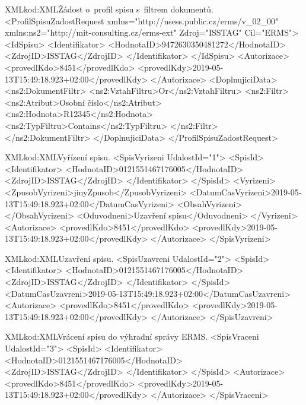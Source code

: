\documentclass[
  master,
  field=ainfp,
  biblatex,
  language=czech,
  glossaries,
  theorems=false,
  index
]{kidiplom}
\begin{document}
\begin{kicode}{XML}{kod:XML}{Žádost o~profil spisu s~filtrem dokumentů.}
<ProfilSpisuZadostRequest xmlns="http://nsess.public.cz/erms/v_02_00" 
    xmlns:ns2="http://mit-consulting.cz/erms-ext" Zdroj="ISSTAG" Cil="ERMS">
    <IdSpisu>
        <Identifikator>
            <HodnotaID>9472630350481272</HodnotaID>
            <ZdrojID>ISSTAG</ZdrojID>
        </Identifikator>
    </IdSpisu>
    <Autorizace>
        <provedlKdo>8451</provedlKdo>
        <provedlKdy>2019-05-13T15:49:18.923+02:00</provedlKdy>
    </Autorizace>
    <DoplnujiciData>
        <ns2:DokumentFiltr>
            <ns2:VztahFiltru>Or</ns2:VztahFiltru>
            <ns2:Filtr>
                <ns2:Atribut>Osobní číslo</ns2:Atribut>
                <ns2:Hodnota>R12345</ns2:Hodnota>
                <ns2:TypFiltru>Contains</ns2:TypFiltru>
            </ns2:Filtr>
        </ns2:DokumentFiltr>
    </DoplnujiciData>
</ProfilSpisuZadostRequest>
\end{kicode}

\begin{kicode}{XML}{kod:XML}{Vyřízení spisu.}
<SpisVyrizeni UdalostId="1">
    <SpisId>
        <Identifikator>
            <HodnotaID>0121551467176005</HodnotaID>
            <ZdrojID>ISSTAG</ZdrojID>
        </Identifikator>
    </SpisId>
    <Vyrizeni>
        <ZpusobVyrizeni>jinyZpusob</ZpusobVyrizeni>
        <DatumCasVyrizeni>2019-05-13T15:49:18.923+02:00</DatumCasVyrizeni>
        <ObsahVyrizeni></ObsahVyrizeni>
        <Oduvodneni>Uzavření spisu</Oduvodneni>
    </Vyrizeni>
    <Autorizace>
        <provedlKdo>8451</provedlKdo>
        <provedlKdy>2019-05-13T15:49:18.923+02:00</provedlKdy>
    </Autorizace>
</SpisVyrizeni>
\end{kicode}

\begin{kicode}{XML}{kod:XML}{Uzavření spisu.}
<SpisUzavreni UdalostId="2">
    <SpisId>
        <Identifikator>
            <HodnotaID>0121551467176005</HodnotaID>
            <ZdrojID>ISSTAG</ZdrojID>
        </Identifikator>
    </SpisId>
    <DatumCasUzavreni>2019-05-13T15:49:18.923+02:00</DatumCasUzavreni>
    <Autorizace>
        <provedlKdo>8451</provedlKdo>
        <provedlKdy>2019-05-13T15:49:18.923+02:00</provedlKdy>
    </Autorizace>
</SpisUzavreni>
\end{kicode}

\begin{kicode}{XML}{kod:XML}{Vrácení spisu do výhradní správy ERMS.}
<SpisVraceni UdalostId="3">
    <SpisId>
        <Identifikator>
            <HodnotaID>0121551467176005</HodnotaID>
            <ZdrojID>ISSTAG</ZdrojID>
        </Identifikator>
    </SpisId>
    <Autorizace>
        <provedlKdo>8451</provedlKdo>
        <provedlKdy>2019-05-13T15:49:18.923+02:00</provedlKdy>
    </Autorizace>
</SpisVraceni>
\end{kicode}
\end{document}
